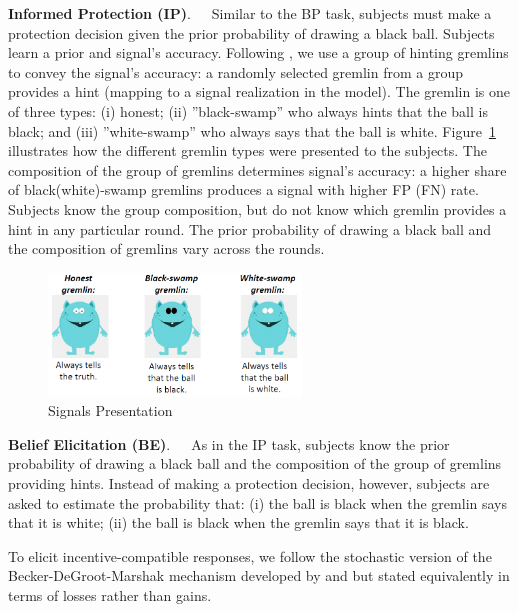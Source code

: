 \documentclass[12pt,a4paper]{article}
\begin{document}
\bigskip
\noindent\textbf{Informed Protection (IP)}.\ \ \ Similar to the BP task, subjects must make a protection decision given the prior probability of drawing a black ball. Subjects learn a prior and signal's accuracy. Following \citet{coutts_good_2019}, we use a group of hinting gremlins to convey the signal's accuracy: a randomly selected gremlin from a group provides a hint (mapping to a signal realization in the model). The gremlin is one of three types: (i) honest; (ii) ''black-swamp'' who always hints that the ball is black; and (iii) ''white-swamp'' who always says that the ball is white. Figure~\ref{fig:Gremlins} illustrates how the different gremlin types were presented to the subjects. The composition of the group of gremlins determines signal's accuracy: a higher share of black(white)-swamp gremlins produces a signal with higher FP (FN) rate. Subjects know the group composition, but do not know which gremlin provides a hint in any particular round. The prior probability of drawing a black ball and the composition of gremlins vary across the rounds.  

\begin{figure}[H]
\centering
\caption{Signals Presentation} \label{fig:Gremlins}
\includegraphics[width=0.6\textwidth]{Graphs/gremlins1.png}
\end{figure}


\bigskip
\noindent\textbf{Belief Elicitation (BE)}.\ \ \ 
As in the IP task, subjects know the prior probability of drawing a black ball and the composition of the group of gremlins providing hints. Instead of making a protection decision, however, subjects are asked to estimate the probability that: (i) the ball is black when the gremlin says that it is white; (ii) the ball is black when the gremlin says that it is black. 

To elicit incentive-compatible responses, we follow the stochastic version of the Becker-DeGroot-Marshak mechanism developed by \citet{grether_testing_1992} and \citet{holt_update_2009} but stated equivalently in terms of losses rather than gains.
\end{document}
